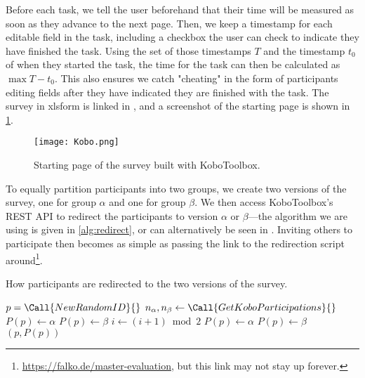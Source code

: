 \documentclass[../thesis]{subfiles}
\begin{document}
Before each task, we tell the user beforehand that their time will be measured as soon as they advance to the next page.
Then, we keep a timestamp for each editable field in the task, including a checkbox the user can check to indicate they have finished the task.
Using the set of those timestamps $T$ and the timestamp $t_0$ of when they started the task, the time for the task can then be calculated as $\max T - t_0$.
This also ensures we catch "cheating" in the form of participants editing fields after they have indicated they are finished with the task.
The survey in \gls{xlsform} is linked in , and a screenshot of the starting page is shown in \cref{fig:kobo}.

\begin{figure}
	\begin{center}
		\texttt{[image: Kobo.png]}
	\end{center}
	\caption{Starting page of the survey built with KoboToolbox.}\label{fig:kobo}
\end{figure}


To equally partition participants into two groups, we create two versions of the survey, one for group $\alpha$ and one for group $\beta$.
We then access KoboToolbox's REST API to redirect the participants to version $\alpha$ or $\beta$---the algorithm we are using is given in \cref{alg:redirect}, or can alternatively be seen in .
Inviting others to participate then becomes as simple as passing the link to the redirection script around\footnote{
	\url{https://falko.de/master-evaluation}, but this link may not stay up forever.
}.

\begin{algorithm}
	\tikzexternaldisable
	\caption{How participants are redirected to the two versions of the survey.}\label{alg:redirect}
	\begin{algorithmic}[1]
		\small
		\State $p = \Call{NewRandomID}{\null}$
		\EndIf
		\State $n_{\alpha}, n_{\beta} \gets \Call{GetKoboParticipations}{\null}$
		\State $P(p) \gets \alpha$
		\Else
		\State $P(p) \gets \beta$
		\EndIf
		\State $i \gets (i + 1) \bmod 2$
		\State $P(p) \gets \alpha$
		\Else
		\State $P(p) \gets \beta$
		\EndIf
		\EndIf
		\State \Return $(p, P(p))$
	\end{algorithmic}
	\tikzexternalenable
\end{algorithm}
\end{document}

